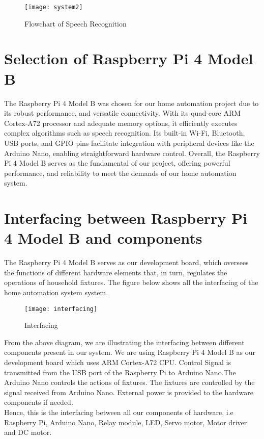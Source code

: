         \begin{figure}[h]
            \centering
            \texttt{[image: system2]}
            \caption{Flowchart of Speech Recognition}
            \label{fig:system2}
        \end{figure}
            
       \section{Selection of Raspberry Pi 4 Model B}
       The Raspberry Pi 4 Model B was chosen for our home automation project due to its robust performance, and versatile connectivity. With its quad-core ARM Cortex-A72 processor and adequate memory options, it efficiently executes complex algorithms such as speech recognition. Its built-in Wi-Fi, Bluetooth, USB ports, and GPIO pins facilitate integration with peripheral devices like the Arduino Nano, enabling straightforward hardware control. Overall, the Raspberry Pi 4 Model B serves as the fundamental of our project, offering powerful performance, and reliability to meet the demands of our home automation system.

        \section{Interfacing between Raspberry Pi 4 Model B and components}
        The Raspberry Pi 4 Model B serves as our development board, which oversees the functions of different hardware elements that, in turn, regulates  the operations of household fixtures. The figure below shows all the interfacing of the home automation system system.

        \begin{figure}[h]
            \centering
            \texttt{[image: interfacing]}
            \caption{Interfacing}
            \label{fig:interface}
        \end{figure}
        From the above diagram, we are illustrating the interfacing between different components present in our system. We are using Raspberry Pi 4 Model B as our development board which uses ARM Cortex-A72 CPU. Control Signal is transmitted from the USB port of the Raspberry Pi to Arduino Nano.The Arduino Nano controls the actions of fixtures. The fixtures are controlled by the signal received from Arduino Nano. External power is provided to the hardware components if needed.\\
        Hence, this is the interfacing between all our components of hardware, i.e Raspberry Pi, Arduino Nano, Relay module, LED, Servo motor, Motor driver and DC motor.

